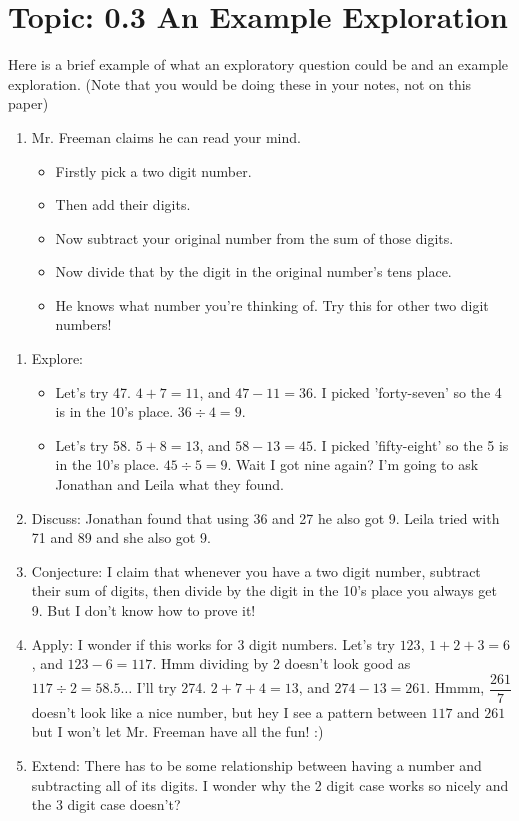 \documentclass[12pt,letterpaper]{article}
\begin{document}
\section*{Topic: 0.3 An Example Exploration}
Here is a brief example of what an exploratory question could be and an example exploration.
(Note that you would be doing these in your notes, not on this paper)
\begin{enumerate}
    \item Mr. Freeman claims he can read your mind.
          \begin{itemize}
              \item Firstly pick a two digit number.
              \item Then add their digits.
              \item Now subtract your original number from the sum of those digits. \item Now divide that by the digit in the original number's tens place.
              \item He knows what number you're thinking of. Try this for other two digit numbers!
          \end{itemize}
\end{enumerate}

\begin{enumerate}
    \item Explore:
          \begin{itemize}
              \item Let's try 47. $4+7=11$, and $47-11=36$. I picked 'forty-seven' so the 4 is in the 10's place. $36\div4=9$.
              \item Let's try 58. $5+8=13$, and $58-13=45$. I picked 'fifty-eight' so the 5 is in the 10's place. $45\div5=9$. Wait I got nine again? I'm going to ask Jonathan and Leila what they found.
          \end{itemize}
    \item Discuss: Jonathan found that using 36 and 27 he also got 9. Leila tried with 71 and 89 and she also got 9.
    \item Conjecture: I claim that whenever you have a two digit number, subtract their sum of digits, then divide by the digit in the 10's place you always get 9. But I don't know how to prove it!
    \item Apply: I wonder if this works for 3 digit numbers. Let's try $123$, $1+2+3=6$, and $123-6=117$. Hmm dividing by 2 doesn't look good as $117\div2=58.5\dots$ I'll try 274. $2+7+4=13$, and $274-13=261$. Hmmm, $\dfrac{261}{7}$ doesn't look like a nice number, but hey I see a pattern between $117$ and $261$ but I won't let Mr. Freeman have all the fun! :)
    \item Extend: There has to be some relationship between having a number and subtracting all of its digits. I wonder why the 2 digit case works so nicely and the 3 digit case doesn't?

\end{enumerate}
\end{document}
